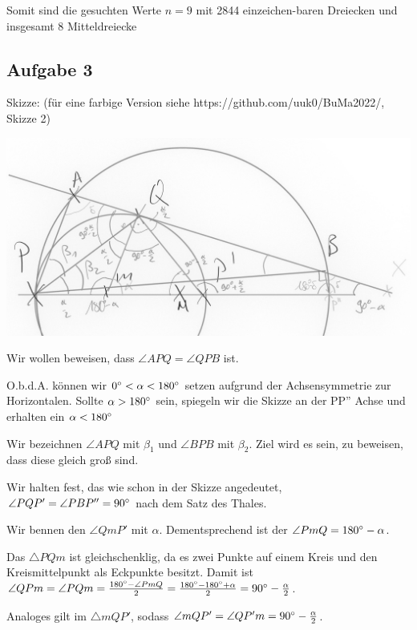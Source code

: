 \documentclass[11pt]{article}
\begin{document}
    \bigskip

    Somit sind die gesuchten Werte $n=9$ mit 2844 einzeichen-baren Dreiecken und insgesamt 8 Mitteldreiecke

    \newpage

    \subsection*{Aufgabe 3}

    Skizze: (für eine farbige Version siehe https://github.com/uuk0/BuMa2022/, Skizze 2)

    \includegraphics{"Aufgabe3_Skizze2_grayscale.jpg"}

    Wir wollen beweisen, dass $\angle APQ = \angle QPB$ ist.

    O.b.d.A. können wir $0 \degree < \alpha < 180 \degree$ setzen aufgrund der Achsensymmetrie zur Horizontalen.
    Sollte $\alpha > 180\degree$ sein, spiegeln wir die Skizze an der PP'' Achse und erhalten ein $\alpha < 180 \degree$

    Wir bezeichnen $\angle APQ$ mit $\beta_1$ und $\angle BPB$ mit $\beta_2$.
    Ziel wird es sein, zu beweisen, dass diese gleich groß sind.

    Wir halten fest, das wie schon in der Skizze angedeutet, $\angle PQP' = \angle PBP'' = 90 \degree$ nach dem
    Satz des Thales.

    Wir bennen den $\angle QmP'$ mit $\alpha$.
    Dementsprechend ist der $\angle PmQ = 180 \degree - \alpha$.

    Das $\triangle PQm$ ist gleichschenklig, da es zwei Punkte auf einem Kreis und den Kreismittelpunkt als Eckpunkte besitzt.
    Damit ist $\angle QPm = \angle PQm = \frac{180 \degree - \angle PmQ}{2} = \frac{180\degree - 180 \degree + \alpha}{2} = 90 \degree - \frac{\alpha}{2}$.

    Analoges gilt im $\triangle mQP'$, sodass $\angle mQP' = \angle QP'm = 90 \degree - \frac{\alpha}{2}$.
\end{document}
